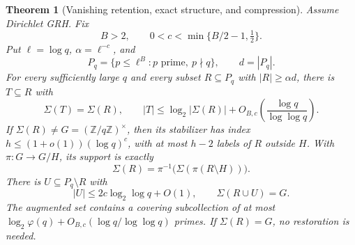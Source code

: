 \documentclass[11pt,a4paper]{article}
\newtheorem{theorem}{Theorem}[section]
\theoremstyle{definition}
\theoremstyle{remark}
\begin{document}
\begin{theorem}[Vanishing retention, exact structure, and compression]\label{p-thm:vanishing-compression}
Assume Dirichlet GRH. Fix
\[
 B>2,\qquad
 0<c<\min\{B/2-1,\tfrac12\}.
\]
Put $\ell=\log q$, $\alpha=\ell^{-c}$, and
\[
 P_q=\{p\leq\ell^B:p\text{ prime},\ p\nmid q\},\qquad d=|P_q|.
\]
For every sufficiently large $q$ and every subset
$R\subseteq P_q$ with $|R|\geq\alpha d$, there is $T\subseteq R$ with
\begin{equation}\label{p-eq:vd-compression}
 \Sigma(T)=\Sigma(R),\qquad
 |T|\leq\log_2|\Sigma(R)|+
 O_{B,c}\left(\frac{\log q}{\log\log q}\right).
\end{equation}
If $\Sigma(R)\ne G=(\mathbb Z/q\mathbb Z)^\times$, then its stabilizer
has index $h\leq(1+o(1))(\log q)^c$, with at most $h-2$ labels
of $R$ outside $H$. With $\pi:G\to G/H$, its support is exactly
\[
 \Sigma(R)=\pi^{-1}\bigl(\Sigma(\pi(R\setminus H))\bigr).
\]
There is $U\subseteq P_q\setminus R$ with
\[
 |U|\leq2c\log_2\log q+O(1),\qquad\Sigma(R\cup U)=G.
\]
The augmented set contains a covering subcollection of at most
$\log_2\varphi(q)+O_{B,c}(\log q/\log\log q)$ primes.
If $\Sigma(R)=G$, no restoration is needed.
\end{theorem}
\end{document}
